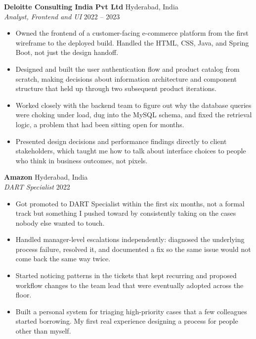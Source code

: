 \documentclass[11pt, letterpaper]{article}
\begin{document}
\textbf{Deloitte Consulting India Pvt Ltd} \hfill Hyderabad, India\\
\textit{Analyst, Frontend and UI} \hfill 2022 -- 2023

\begin{itemize}
  \item Owned the frontend of a customer-facing e-commerce platform from
        the first wireframe to the deployed build. Handled the HTML, CSS,
        Java, and Spring Boot, not just the design handoff.
  \item Designed and built the user authentication flow and product catalog
        from scratch, making decisions about information architecture and
        component structure that held up through two subsequent product
        iterations.
  \item Worked closely with the backend team to figure out why the database
        queries were choking under load, dug into the MySQL schema, and
        fixed the retrieval logic, a problem that had been sitting open
        for months.
  \item Presented design decisions and performance findings directly to
        client stakeholders, which taught me how to talk about interface
        choices to people who think in business outcomes, not pixels.
\end{itemize}

\vspace{6pt}
\textbf{Amazon} \hfill Hyderabad, India\\
\textit{DART Specialist} \hfill 2022

\begin{itemize}
  \item Got promoted to DART Specialist within the first six months, not a formal track but something I pushed toward by consistently
        taking on the cases nobody else wanted to touch.
  \item Handled manager-level escalations independently: diagnosed the
        underlying process failure, resolved it, and documented a fix so
        the same issue would not come back the same way twice.
  \item Started noticing patterns in the tickets that kept recurring and
        proposed workflow changes to the team lead that were eventually
        adopted across the floor.
  \item Built a personal system for triaging high-priority cases that a
        few colleagues started borrowing. My first real experience
        designing a process for people other than myself.
\end{itemize}
\end{document}
